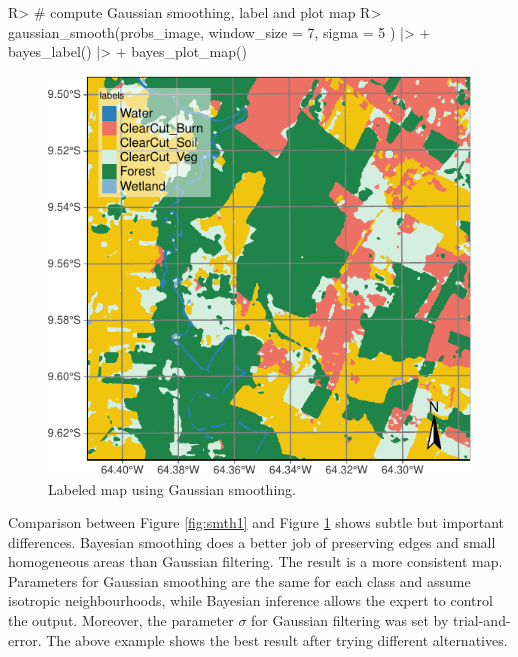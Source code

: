 \documentclass[
  shortnames]{jss}
\begin{document}
\begin{CodeChunk}
\begin{CodeInput}
R> # compute Gaussian smoothing, label and plot map
R> gaussian_smooth(probs_image, window_size = 7, sigma = 5 ) |> 
+   bayes_label() |> 
+   bayes_plot_map()
\end{CodeInput}
\begin{figure}[h]

{\centering \includegraphics{Bayesian_smoothing_JSS_files/figure-latex/gauss-1} 

}

\caption[Labeled map using Gaussian smoothing]{Labeled map using Gaussian smoothing.}\label{fig:gauss}
\end{figure}
\end{CodeChunk}

Comparison between Figure \ref{fig:smth1} and Figure \ref{fig:gauss} shows subtle but important differences. Bayesian smoothing does a better job of preserving edges and small homogeneous areas than Gaussian filtering. The result is a more consistent map. Parameters for Gaussian smoothing are the same for each class and assume isotropic neighbourhoods, while Bayesian inference allows the expert to control the output. Moreover, the parameter \(\sigma\) for Gaussian filtering was set by trial-and-error. The above example shows the best result after trying different alternatives.
\end{document}
